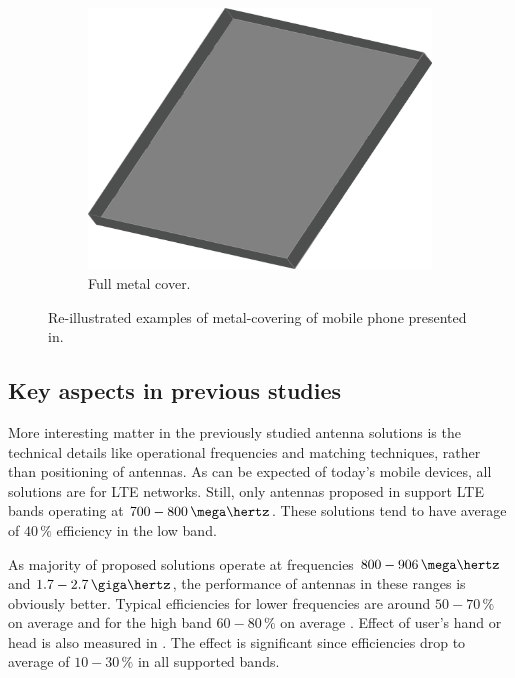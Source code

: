 \begin{figure}[H]
\begin{subfigure}[b]{0.3\textwidth}
        \includegraphics[width=\textwidth]{img/metal_cover_full.eps}
        \caption{Full metal cover.}
        \label{fig:full_cover}
    \end{subfigure}
    \caption{Re-illustrated examples of metal-covering of mobile phone presented in\cite{chen_compact_lte}.}
    \label{fig:metal_covers}
\end{figure}



\subsection{Key aspects in previous studies}
\label{sec:key_aspects}
More interesting matter in the previously studied antenna solutions is the technical details like operational frequencies and matching techniques, rather than positioning of antennas. As can be expected of today's mobile devices, all solutions are for LTE networks. Still, only antennas proposed in \cite{stanley_lte_mimo, son_wideband_mimo, chen_compact_lte, chen_metal_frame} support LTE bands operating at $700-800\,\mega\hertz$. These solutions tend to have average of $40\,\%$ efficiency in the low band. 

As majority of proposed solutions operate at frequencies $800-906\,\mega\hertz$ and $1.7-2.7\,\giga\hertz$, the performance of antennas in these ranges is obviously better. Typical efficiencies for lower frequencies are around $50-70\,\%$ on average and for the high band $60-80\,\%$ on average \cite{ban_dual_loop,chen_compact_lte,son_wideband_mimo,chen_metal_frame,zhong_pier}. Effect of user's hand or head is also measured in \cite{zhong_pier, chen_metal_frame,ban_dual_loop}. The effect is significant since efficiencies drop to average of $10-30\,\%$ in all supported bands. 

